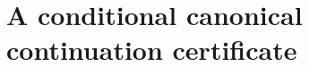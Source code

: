 \section{A conditional canonical continuation certificate}
\label{app:canonical-local-certificate}

